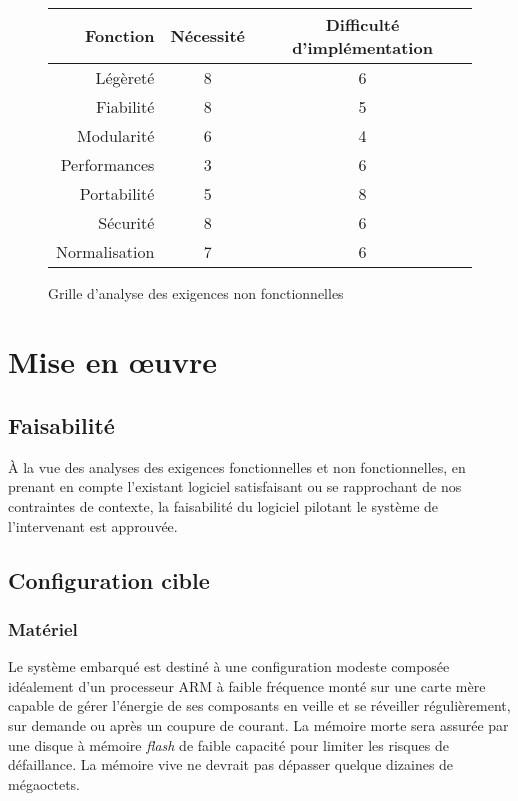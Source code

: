 \documentclass[a4paper, 11pt, final]{article}
\begin{document}
\paragraph{}
\begin{figure}[h!]
\begin{center}
\begin{tabular}{|r|c|c|}
\hline
Fonction & Nécessité & Difficulté d'implémentation\\ \hline \hline
Légèreté & 8 & 6\\ \hline
Fiabilité & 8 & 5\\ \hline
Modularité & 6 & 4\\ \hline
Performances & 3 & 6\\ \hline
Portabilité & 5 & 8\\ \hline
Sécurité & 8 & 6\\ \hline
Normalisation & 7 & 6\\ \hline
\end{tabular}
\end{center}
\caption{Grille d'analyse des exigences non fonctionnelles}
\end{figure}
\FloatBarrier


\section{Mise en œuvre}

\subsection{Faisabilité}
À la vue des analyses des exigences fonctionnelles et non fonctionnelles, en prenant en compte l'existant logiciel satisfaisant ou se rapprochant de nos contraintes de contexte, la faisabilité du logiciel pilotant le système de l'intervenant est approuvée.

\subsection{Configuration cible}

\subsubsection{Matériel} %
Le système embarqué est destiné à une configuration modeste composée idéalement d'un processeur ARM à faible fréquence monté sur une carte mère capable de gérer l'énergie de ses composants en veille et se réveiller régulièrement, sur demande ou après un coupure de courant. La mémoire morte sera assurée par une disque à mémoire \emph{flash} de faible capacité pour limiter les risques de défaillance. La mémoire vive ne devrait pas dépasser quelque dizaines de mégaoctets.
\end{document}
